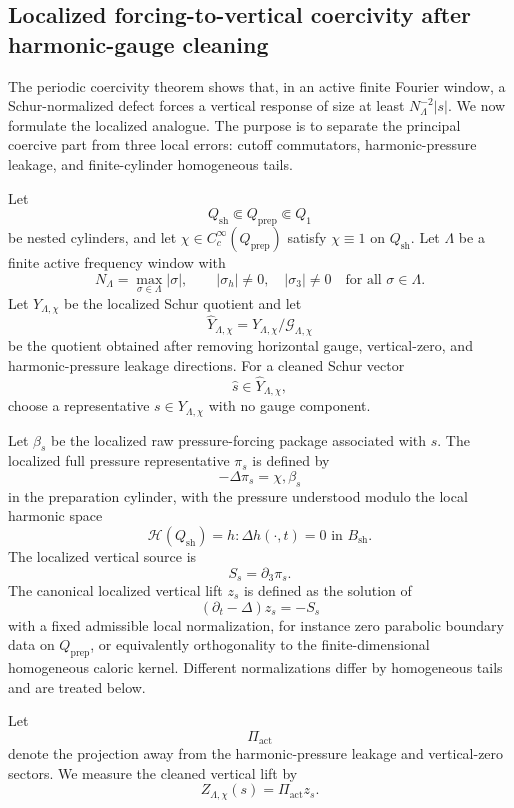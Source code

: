 \documentclass[11pt]{article}
\numberwithin{equation}{section}
\begin{document}
\subsection{Localized forcing-to-vertical coercivity after harmonic-gauge cleaning}

The periodic coercivity theorem shows that, in an active finite Fourier window, a Schur-normalized defect forces a vertical response of size at least \(N_\Lambda^{-2}|s|\). We now formulate the localized analogue. The purpose is to separate the principal coercive part from three local errors: cutoff commutators, harmonic-pressure leakage, and finite-cylinder homogeneous tails.

Let
\[
Q_{\mathrm{sh}}\Subset Q_{\mathrm{prep}}\Subset Q_1
\]
be nested cylinders, and let \(\chi\in C_c^\infty(Q_{\mathrm{prep}})\) satisfy \(\chi\equiv1\) on \(Q_{\mathrm{sh}}\). Let \(\Lambda\) be a finite active frequency window with
\[
N_\Lambda=\max_{\sigma\in\Lambda}|\sigma|,
\qquad
|\sigma_h|\neq0,\quad |\sigma_3|\neq0
\quad
\text{for all }\sigma\in\Lambda.
\]
Let \(Y_{\Lambda,\chi}\) be the localized Schur quotient and let
\[
\widehat Y_{\Lambda,\chi} =
Y_{\Lambda,\chi}/\mathcal G_{\Lambda,\chi}
\]
be the quotient obtained after removing horizontal gauge, vertical-zero, and harmonic-pressure leakage directions. For a cleaned Schur vector
\[
\widehat s\in \widehat Y_{\Lambda,\chi},
\]
choose a representative \(s\in Y_{\Lambda,\chi}\) with no gauge component.

Let \(\beta_s\) be the localized raw pressure-forcing package associated with \(s\). The localized full pressure representative \(\pi_s\) is defined by
\[
-\Delta \pi_s =
\chi,\beta_s
\]
in the preparation cylinder, with the pressure understood modulo the local harmonic space
\[
\mathcal H(Q_{\mathrm{sh}}) =
{h:\Delta h(\cdot,t)=0\text{ in }B_{\mathrm{sh}}}.
\]
The localized vertical source is
\[
S_s =
\partial_3\pi_s.
\]
The canonical localized vertical lift \(z_s\) is defined as the solution of
\begin{equation}
(\partial_t-\Delta)z_s =
-S_s
\label{eq:tag-10-210}
\end{equation}
with a fixed admissible local normalization, for instance zero parabolic boundary data on \(Q_{\mathrm{prep}}\), or equivalently orthogonality to the finite-dimensional homogeneous caloric kernel. Different normalizations differ by homogeneous tails and are treated below.

Let
\[
\Pi_{\mathrm{act}}
\]
denote the projection away from the harmonic-pressure leakage and vertical-zero sectors. We measure the cleaned vertical lift by
\[
Z_{\Lambda,\chi}(s) =
\Pi_{\mathrm{act}}z_s.
\]
\end{document}
